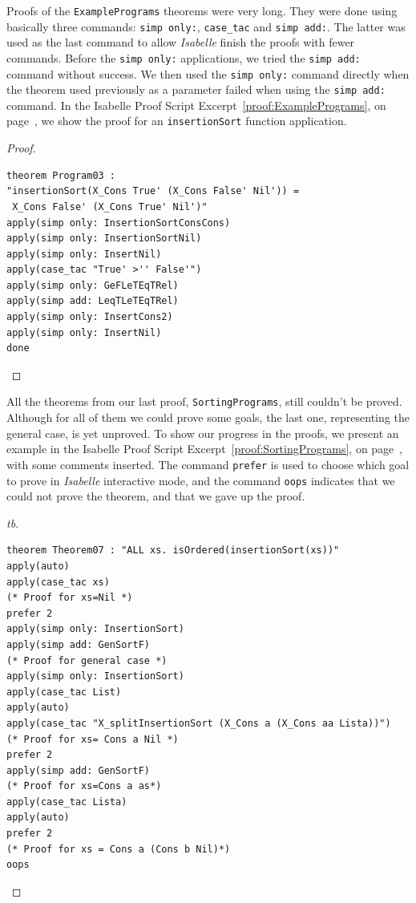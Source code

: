 \documentclass[12pt,twoside]{article}
\numberwithin{spec}{subsection}
\numberwithin{proof}{subsection}
\numberwithin{figure}{subsection}
\numberwithin{code}{subsection}
\newcommand{\citeProof}[1]{Isabelle Proof Script Excerpt~\ref{#1}, on page~\pageref{#1}}
\begin{document}
Proofs of the \verb.ExamplePrograms. theorems were very long. They were done using basically three commands: \verb.simp only:., \verb.case_tac. and \verb.simp add:.. The latter was used as the last command to allow \textit{Isabelle} finish the proofs with fewer commands. Before the \verb.simp only:. applications, we tried the \verb.simp add:. command without success. We then used the \verb.simp only:. command directly when the theorem used previously as a parameter failed when using the \verb.simp add:. command. In the \citeProof{proof:ExamplePrograms}, we show the proof for an \verb.insertionSort. function application.

\begin{proof}\capstart
\begin{verbatim}
theorem Program03 :
"insertionSort(X_Cons True' (X_Cons False' Nil')) =
 X_Cons False' (X_Cons True' Nil')"
apply(simp only: InsertionSortConsCons)
apply(simp only: InsertionSortNil)
apply(simp only: InsertNil)
apply(case_tac "True' >'' False'")
apply(simp only: GeFLeTEqTRel)
apply(simp add: LeqTLeTEqTRel)
apply(simp only: InsertCons2)
apply(simp only: InsertNil)
done
\end{verbatim}
\caption{Proof for theorem Program03, an example of insertionSort function application from specification ExamplePrograms.}
\label{proof:ExamplePrograms}
\end{proof}

All the theorems from our last proof, \verb.SortingPrograms., still couldn't be proved. Although for all of them we could prove some goals, the last one, representing the general case, is yet unproved. To show our progress in the proofs, we present an example in the \citeProof{proof:SortingPrograms}, with some comments inserted. The command \verb.prefer. is used to choose which goal to prove in \textit{Isabelle} interactive mode, and the command \verb.oops. indicates that we could not prove the theorem, and that we gave up the proof.

\begin{proof}[tb]\capstart
\begin{verbatim}
theorem Theorem07 : "ALL xs. isOrdered(insertionSort(xs))"
apply(auto)
apply(case_tac xs)
(* Proof for xs=Nil *)
prefer 2
apply(simp only: InsertionSort)
apply(simp add: GenSortF)
(* Proof for general case *)
apply(simp only: InsertionSort)
apply(case_tac List)
apply(auto)
apply(case_tac "X_splitInsertionSort (X_Cons a (X_Cons aa Lista))")
(* Proof for xs= Cons a Nil *)
prefer 2
apply(simp add: GenSortF)
(* Proof for xs=Cons a as*)
apply(case_tac Lista)
apply(auto)
prefer 2
(* Proof for xs = Cons a (Cons b Nil)*)
oops
\end{verbatim}
\caption{Actual status of the proof for theorem Theorem07 of specification SortingPrograms.}
\label{proof:SortingPrograms}
\end{proof}
\end{document}
